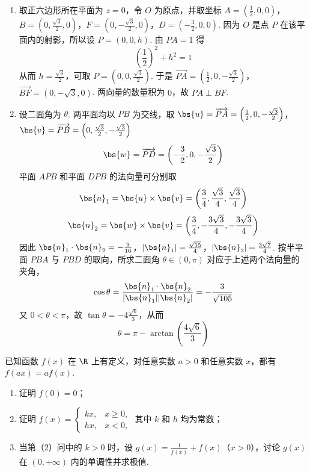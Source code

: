 \begin{solution}
\begin{enumerate}
\item 取正六边形所在平面为 \(z=0\)，令 \(O\) 为原点，并取坐标
\(A=\left(\frac12,0,0\right)\)，\(B=\left(0,\frac{\sqrt3}{2},0\right)\)，\(F=\left(0,-\frac{\sqrt3}{2},0\right)\)，\(D=\left(-\frac32,0,0\right)\).
因为 \(O\) 是点 \(P\) 在该平面内的射影，所以设 \(P=(0,0,h)\). 由 \(PA=1\) 得
\[
\left(\frac12\right)^2+h^2=1
\]
从而 \(h=\frac{\sqrt3}{2}\)，可取 \(P=(0,0,\frac{\sqrt3}{2})\). 于是
\(\overrightarrow{PA}=\left(\frac12,0,-\frac{\sqrt3}{2}\right)\)，\(\overrightarrow{BF}=\left(0,-\sqrt3,0\right)\).
两向量的数量积为 \(0\)，故 \(PA\perp BF\).

\item 设二面角为 \(\theta\). 两平面均以 \(PB\) 为交线，取
\(\bs{u}=\overrightarrow{PA}=\left(\frac12,0,-\frac{\sqrt3}{2}\right)\)，\(\bs{v}=\overrightarrow{PB}=\left(0,\frac{\sqrt3}{2},-\frac{\sqrt3}{2}\right)\)
\[
\bs{w}=\overrightarrow{PD}=\left(-\frac32,0,-\frac{\sqrt3}{2}\right)
\]
平面 \(APB\) 和平面 \(DPB\) 的法向量可分别取
\[
\bs{n}_1=\bs{u}\times\bs{v}
=\left(\frac34,\frac{\sqrt3}{4},\frac{\sqrt3}{4}\right)
\]
\[
\bs{n}_2=\bs{w}\times\bs{v}
=\left(\frac34,-\frac{3\sqrt3}{4},-\frac{3\sqrt3}{4}\right)
\]
因此
\(\bs{n}_1\cdot\bs{n}_2=-\frac{9}{16}\)，\(|\bs{n}_1|=\frac{\sqrt{15}}4\)，\(|\bs{n}_2|=\frac{3\sqrt7}{4}\).
按半平面 \(PBA\) 与 \(PBD\) 的取向，所求二面角 \(\theta\in(0,\pi)\) 对应于上述两个法向量的夹角，
\[
\cos\theta=\frac{\bs{n}_1\cdot\bs{n}_2}{|\bs{n}_1||\bs{n}_2|}
=-\frac{3}{\sqrt{105}}
\]
又 \(0<\theta<\pi\)，故 \(\tan\theta=-4\frac{\sqrt6}{3}\)，从而
\[
\theta=\pi-\arctan\left(\frac{4\sqrt6}{3}\right)
\]
\end{enumerate}
\end{solution}

\begin{problem}
已知函数 \(f(x)\) 在 \(\R\) 上有定义，对任意实数 \(a > 0\) 和任意实数 \(x\)，都有 \(f(ax) = af(x)\).

\begin{enumerate}
\item 证明 \(f(0) = 0\)；
\item 证明 \(f(x) = \begin{cases}
kx, & x \geqslant 0,\\
hx, & x < 0,
\end{cases}\) 其中 \(k\) 和 \(h\) 均为常数；
\item 当第（2）问中的 \(k > 0\) 时，设 \(g(x) = \frac{1}{f(x)} + f(x)\)（\(x > 0\)），讨论 \(g(x)\) 在 \((0, +\infty)\) 内的单调性并求极值.
\end{enumerate}
\end{problem}

